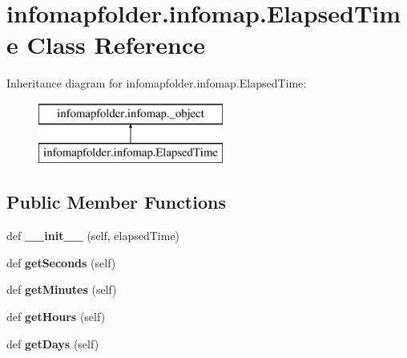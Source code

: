 \hypertarget{classinfomapfolder_1_1infomap_1_1ElapsedTime}{}\section{infomapfolder.\+infomap.\+Elapsed\+Time Class Reference}
\label{classinfomapfolder_1_1infomap_1_1ElapsedTime}
Inheritance diagram for infomapfolder.\+infomap.\+Elapsed\+Time\+:\begin{figure}[H]
\begin{center}
\leavevmode
\includegraphics[height=2.000000cm]{classinfomapfolder_1_1infomap_1_1ElapsedTime}
\end{center}
\end{figure}
\subsection*{Public Member Functions}
\begin{DoxyCompactItemize}
\item 
\mbox{\label{classinfomapfolder_1_1infomap_1_1ElapsedTime_aefb92ddd009e602e4c48905ad241bf5a}} 
def {\bfseries \+\_\+\+\_\+init\+\_\+\+\_\+} (self, elapsed\+Time)
\item 
\mbox{\label{classinfomapfolder_1_1infomap_1_1ElapsedTime_a5031a317265946f1fe7c77663d548382}} 
def {\bfseries get\+Seconds} (self)
\item 
\mbox{\label{classinfomapfolder_1_1infomap_1_1ElapsedTime_a0124b9be91612768ed0c459339f75b28}} 
def {\bfseries get\+Minutes} (self)
\item 
\mbox{\label{classinfomapfolder_1_1infomap_1_1ElapsedTime_ae9dac54d75ce4e37e80762805cd9a95a}} 
def {\bfseries get\+Hours} (self)
\item 
\mbox{\label{classinfomapfolder_1_1infomap_1_1ElapsedTime_a9a169316e9eaba3e6bf1749172af995b}} 
def {\bfseries get\+Days} (self)
\end{DoxyCompactItemize}
